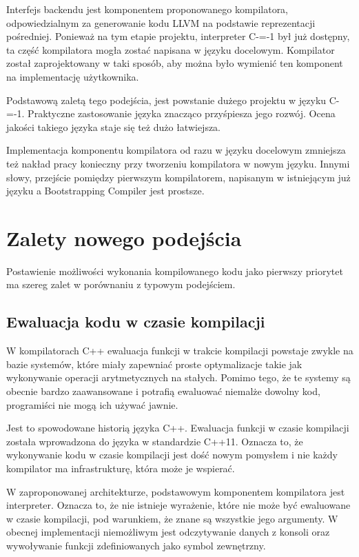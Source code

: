 \documentclass[conference]{IEEEtran}
\begin{document}
Interfejs backendu jest komponentem proponowanego kompilatora, odpowiedzialnym za generowanie kodu LLVM na podstawie reprezentacji pośredniej.
Ponieważ na tym etapie projektu, interpreter C-=-1 był już dostępny, ta część kompilatora mogła zostać napisana w języku docelowym.
Kompilator został zaprojektowany w taki sposób, aby można było wymienić ten komponent na implementację użytkownika.

Podstawową zaletą tego podejścia, jest powstanie dużego projektu w języku C-=-1.
Praktyczne zastosowanie języka znacząco przyśpiesza jego rozwój.
Ocena jakości takiego języka staje się też dużo łatwiejsza.

Implementacja komponentu kompilatora od razu w języku docelowym zmniejsza też nakład pracy konieczny przy tworzeniu kompilatora w nowym języku.
Innymi słowy, przejście pomiędzy pierwszym kompilatorem, napisanym w istniejącym już języku a Bootstrapping Compiler jest prostsze.

\section{Zalety nowego podejścia}

Postawienie możliwości wykonania kompilowanego kodu jako pierwszy priorytet ma szereg zalet w porównaniu z typowym podejściem.

\subsection{Ewaluacja kodu w czasie kompilacji}

W kompilatorach C++ ewaluacja funkcji w trakcie kompilacji powstaje zwykle na bazie systemów, które miały zapewniać proste optymalizacje takie jak wykonywanie operacji arytmetycznych na stałych.
Pomimo tego, że te systemy są obecnie bardzo zaawansowane i potrafią ewaluować niemalże dowolny kod, programiści nie mogą ich używać jawnie.

Jest to spowodowane historią języka C++.
Ewaluacja funkcji w czasie kompilacji została wprowadzona do języka w standardzie C++11.
Oznacza to, że wykonywanie kodu w czasie kompilacji jest dość nowym pomysłem i nie każdy kompilator ma infrastrukturę, która może je wspierać.

W zaproponowanej architekturze, podstawowym komponentem kompilatora jest interpreter.
Oznacza to, że nie istnieje wyrażenie, które nie może być ewaluowane w czasie kompilacji, pod warunkiem, że znane są wszystkie jego argumenty.
W obecnej implementacji niemożliwym jest odczytywanie danych z konsoli oraz wywoływanie funkcji zdefiniowanych jako symbol zewnętrzny.
\end{document}

